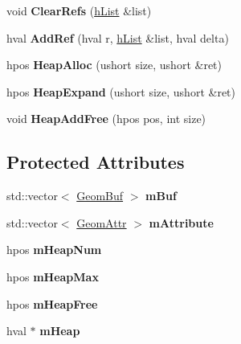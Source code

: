 \begin{DoxyCompactItemize}
\item 
\hypertarget{class_geom_x_ad0993220f239972044610fcd66d94e0c}{void {\bfseries Clear\+Refs} (\hyperlink{structh_list}{h\+List} \&list)}\label{class_geom_x_ad0993220f239972044610fcd66d94e0c}

\item 
\hypertarget{class_geom_x_a163e04510867b1761c03b718e34670e0}{hval {\bfseries Add\+Ref} (hval r, \hyperlink{structh_list}{h\+List} \&list, hval delta)}\label{class_geom_x_a163e04510867b1761c03b718e34670e0}

\item 
\hypertarget{class_geom_x_a58e72daa2a4c10312016ae30d49d8f5f}{hpos {\bfseries Heap\+Alloc} (ushort size, ushort \&ret)}\label{class_geom_x_a58e72daa2a4c10312016ae30d49d8f5f}

\item 
\hypertarget{class_geom_x_af787201ea91b1d38f27695a3053fe0da}{hpos {\bfseries Heap\+Expand} (ushort size, ushort \&ret)}\label{class_geom_x_af787201ea91b1d38f27695a3053fe0da}

\item 
\hypertarget{class_geom_x_ac57f4d470403b3048b1b1bc6d657d958}{void {\bfseries Heap\+Add\+Free} (hpos pos, int size)}\label{class_geom_x_ac57f4d470403b3048b1b1bc6d657d958}

\end{DoxyCompactItemize}
\subsection*{Protected Attributes}
\begin{DoxyCompactItemize}
\item 
\hypertarget{class_geom_x_a395fed775b5036cf813324fee52066eb}{std\+::vector$<$ \hyperlink{class_geom_buf}{Geom\+Buf} $>$ {\bfseries m\+Buf}}\label{class_geom_x_a395fed775b5036cf813324fee52066eb}

\item 
\hypertarget{class_geom_x_a5de92fb8b995d9f6e3fd248e3590f4c8}{std\+::vector$<$ \hyperlink{class_geom_attr}{Geom\+Attr} $>$ {\bfseries m\+Attribute}}\label{class_geom_x_a5de92fb8b995d9f6e3fd248e3590f4c8}

\item 
\hypertarget{class_geom_x_ae885a4b247e8db5d82a9cfb02fc4336a}{hpos {\bfseries m\+Heap\+Num}}\label{class_geom_x_ae885a4b247e8db5d82a9cfb02fc4336a}

\item 
\hypertarget{class_geom_x_a5857769f7f041aec2b0698b4c5395542}{hpos {\bfseries m\+Heap\+Max}}\label{class_geom_x_a5857769f7f041aec2b0698b4c5395542}

\item 
\hypertarget{class_geom_x_acc150b07c16c4951324c7e4142b952f7}{hpos {\bfseries m\+Heap\+Free}}\label{class_geom_x_acc150b07c16c4951324c7e4142b952f7}

\item 
\hypertarget{class_geom_x_a5db4542762c8f5393336cbf1e2046760}{hval $\ast$ {\bfseries m\+Heap}}\label{class_geom_x_a5db4542762c8f5393336cbf1e2046760}

\end{DoxyCompactItemize}


